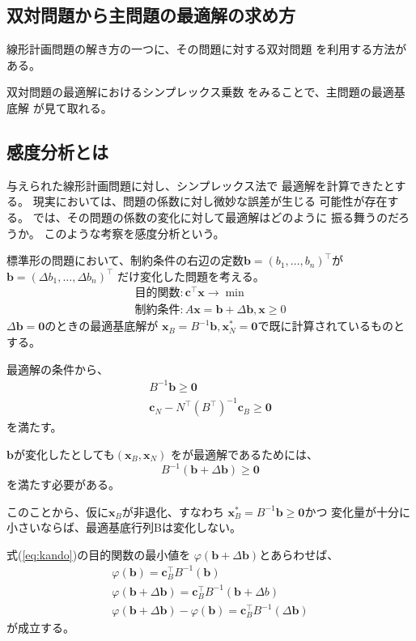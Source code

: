 \documentclass[9pt]{ltjsreport}
\begin{document}
\subsection{双対問題から主問題の最適解の求め方}
線形計画問題の解き方の一つに、その問題に対する双対問題
を利用する方法がある。

双対問題の最適解におけるシンプレックス乗数
をみることで、主問題の最適基底解
が見て取れる。

\newpage
\subsection{感度分析とは}
与えられた線形計画問題に対し、シンプレックス法で
最適解を計算できたとする。
現実においては、問題の係数に対し微妙な誤差が生じる
可能性が存在する。
では、その問題の係数の変化に対して最適解はどのように
振る舞うのだろうか。
このような考察を感度分析という。

標準形の問題において、制約条件の右辺の定数$\bm{b}=(b_1,
\dots,b_n)^\top$が$\bm{b}=(\Delta b_1,\dots,\Delta b_n)^\top$
だけ変化した問題を考える。
\begin{align}
    \text{目的関数}:\bm{c}^\top\bm{x}\longrightarrow \min\\
    \text{制約条件}:A\bm{x}=\bm{b}+\Delta\bm{b},\bm{x}\ge 0
\end{align}
$\Delta \bm{b}=\bm{0}$のときの最適基底解が
$\bm{x}_B=B^{-1}\bm{b},\bm{x}_N^*=\bm{0}$で既に計算されているものとする。

最適解の条件から、
\begin{gather}
    B^{-1}\bm{b}\ge\bm{0}\label{eq:kando}\\
    \bm{c}_N-N^\top(B^\top)^{-1}\bm{c}_B\ge\bm{0}
\end{gather}
を満たす。

$\bm{b}$が変化したとしても$(\bm{x}_B,\bm{x}_N)$
をが最適解であるためには、
\begin{equation}
    B^{-1}(\bm{b}+\Delta \bm{b})\ge\bm{0}
\end{equation}
を満たす必要がある。

このことから、仮に$\bm{x}_B$が非退化、すなわち
$\bm{x}_B^*=B^{-1}\bm{b}\ge\bm{0}$かつ
変化量が十分に小さいならば、最適基底行列Bは変化しない。

式(\ref{eq:kando})の目的関数の最小値を
$\varphi(\bm{b}+\Delta\bm{b})$とあらわせば、
\begin{gather}
    \varphi(\bm{b})
    =\bm{c}_B^\top B^{-1}(\bm{b})\\
    \varphi(\bm{b}+\Delta\bm{b})
    =\bm{c}_B^\top B^{-1}(\bm{b}+\Delta{b})\\
    \varphi(\bm{b}+\Delta\bm{b})-\varphi(\bm{b})
    =\bm{c}_B^\top B^{-1}(\Delta\bm{b})
\end{gather}
が成立する。
\end{document}
